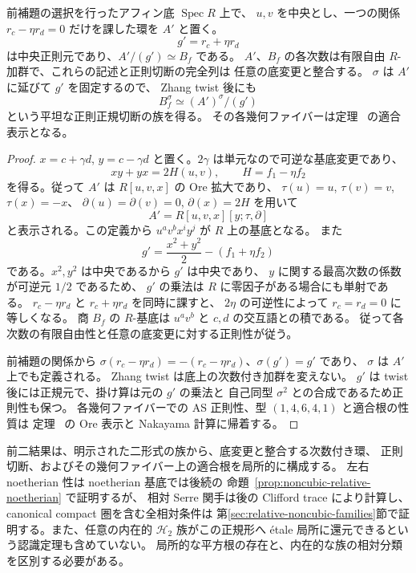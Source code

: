 \begin{proposition}[局所的な正則切断の族]
\label{prop:noncubic-relative-regular-cut}
前補題の選択を行ったアフィン底 $\operatorname{Spec}R$ 上で、
$u,v$ を中央とし、一つの関係 $r_c-\eta r_d=0$ だけを課した環を $A'$ と置く。
\[
 g'=r_c+\eta r_d
\]
は中央正則元であり、$A'/(g')\simeq B_f$ である。
$A'$、$B_f$ の各次数は有限自由 $R$-加群で、これらの記述と正則切断の完全列は
任意の底変更と整合する。
$\sigma$ は $A'$ に延びて $g'$ を固定するので、
Zhang twist 後にも
\[
 B_f^\sigma\simeq (A')^\sigma/(g')
\]
という平坦な正則正規切断の族を得る。
その各幾何ファイバーは定理~\cite[\texttt{thm:ore-anticommuting-central}]{QuadricIntrinsic2026} の適合表示となる。
\end{proposition}

\begin{proof}
$x=c+\gamma d$, $y=c-\gamma d$ と置く。$2\gamma$ は単元なので可逆な基底変更であり、
\[
 xy+yx=2H(u,v),\qquad H=f_1-\eta f_2
\]
を得る。従って $A'$ は $R[u,v,x]$ の Ore 拡大であり、
$\tau(u)=u$, $\tau(v)=v$, $\tau(x)=-x$、
$\partial(u)=\partial(v)=0$, $\partial(x)=2H$ を用いて
\[
 A'=R[u,v,x][y;\tau,\partial]
\]
と表示される。この定義から $u^a v^b x^i y^j$ が $R$ 上の基底となる。
また
\[
 g'=\frac{x^2+y^2}{2}-(f_1+\eta f_2)
\]
である。$x^2,y^2$ は中央であるから $g'$ は中央であり、
$y$ に関する最高次数の係数が可逆元 $1/2$ であるため、
$g'$ の乗法は $R$ に零因子がある場合にも単射である。
$r_c-\eta r_d$ と $r_c+\eta r_d$ を同時に課すと、
$2\eta$ の可逆性によって $r_c=r_d=0$ に等しくなる。
商 $B_f$ の $R$-基底は $u^a v^b$ と $c,d$ の交互語との積である。
従って各次数の有限自由性と任意の底変更に対する正則性が従う。

前補題の関係から
$\sigma(r_c-\eta r_d)=-(r_c-\eta r_d)$、$\sigma(g')=g'$ であり、
$\sigma$ は $A'$ 上でも定義される。
Zhang twist は底上の次数付き加群を変えない。
$g'$ は twist 後には正規元で、掛け算は元の $g'$ の乗法と
自己同型 $\sigma^2$ との合成であるため正則性も保つ。
各幾何ファイバーでの AS 正則性、型 $(1,4,6,4,1)$ と適合根の性質は
定理~\cite[\texttt{thm:ore-anticommuting-central}]{QuadricIntrinsic2026} の Ore 表示と Nakayama 計算に帰着する。
\end{proof}

\begin{remark}[相対主張の範囲]
前二結果は、明示された二形式の族から、底変更と整合する次数付き環、
正則切断、およびその幾何ファイバー上の適合根を局所的に構成する。
左右 noetherian 性は noetherian 基底では後続の
命題~\ref{prop:noncubic-relative-noetherian} で証明するが、
相対 Serre 関手は後の Clifford trace により計算し、
canonical compact 圏を含む全相対条件は
第\ref{sec:relative-noncubic-families}節で証明する。また、任意の内在的 $\mathcal H_2$ 族がこの正規形へ
\'etale 局所に還元できるという認識定理も含めていない。
局所的な平方根の存在と、内在的な族の相対分類を区別する必要がある。
\end{remark}

